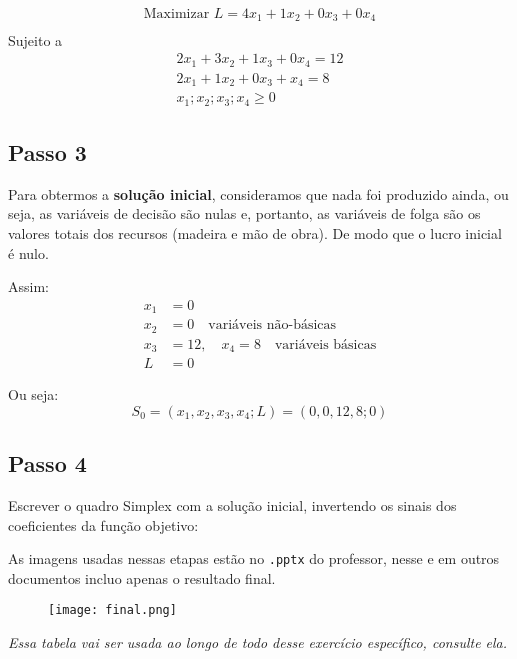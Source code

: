 \documentclass{article}
\begin{document}
\begin{align*}
    \text{Maximizar }L = 4x_1 + 1x_2 + 0x_3 + 0x_4 \\
\end{align*}
Sujeito a
\begin{align*}
    2x_1 + 3x_2 + 1x_3 + 0x_4 = 12 \\
    2x_1 + 1x_2 + 0x_3 + x_4 = 8 \\
    x_1;x_2;x_3;x_4 \geq 0
\end{align*}
\subsection{Passo 3}
Para obtermos a \textbf{solução inicial}, consideramos que nada foi produzido ainda, ou seja, as variáveis de decisão são nulas e, portanto, as variáveis de folga são os valores totais dos recursos (madeira e mão de obra). De modo que o lucro inicial é nulo.

Assim:
\begin{align*}
x_1 &= 0 \\
x_2 &= 0 \quad \text{variáveis não-básicas} \\
x_3 &= 12, \quad x_4 = 8 \quad \text{variáveis básicas} \\
L &= 0
\end{align*}

Ou seja: 
\[
S_0 = (x_1, x_2, x_3, x_4; L) = (0, 0, 12, 8; 0)
\]

\subsection{Passo 4}
Escrever o quadro Simplex com a solução inicial, invertendo os sinais dos coeficientes da função objetivo:

\begin{tcolorbox}[
  colback=yellow!10!white, 
  colframe=yellow!75!black,  
  fonttitle=\bfseries,     
  coltitle=black,         
  sharp corners=south,     
  boxrule=1mm,             
  title=Aviso,  
  width=\textwidth         
]
As imagens usadas nessas etapas estão no \texttt{.pptx} do professor, nesse e em outros documentos incluo apenas o resultado final.
\end{tcolorbox}


\begin{figure}[h]
    \centering
    \texttt{[image: final.png]}
\end{figure}

\textit{Essa tabela vai ser usada ao longo de todo desse exercício específico, consulte ela.}
\end{document}
